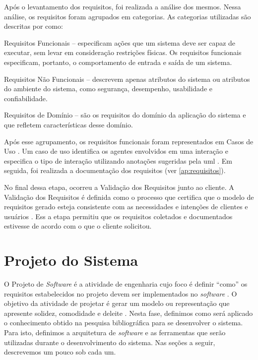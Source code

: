 Após o levantamento dos requisitos, foi realizada a análise dos mesmos. Nessa análise, os requisitos foram agrupados em categorias. As categorias utilizadas são descritas por 
 como:
\begin{alineascomponto}
    \item Requisitos Funcionais -- especificam ações que um sistema deve ser
capaz de executar, sem levar em consideração restrições físicas. Os requisitos
funcionais especificam, portanto, o comportamento de entrada e saída de um
sistema.
    \item Requisitos Não Funcionais -- descrevem apenas atributos do sistema ou
atributos do ambiente do sistema, como segurança, desempenho, usabilidade e
confiabilidade.
    \item Requisitos de Domínio -- são os requisitos do domínio da aplicação do sistema e que refletem características desse domínio.
\end{alineascomponto}

Após esse agrupamento, os requisitos funcionais foram representados em Casos de Uso \cite{jacobson92engenharia}. Um caso de uso identifica os agentes envolvidos em uma interação e especifica o tipo  de interação utilizando anotações sugeridas pela 
\gls{uml} . Em seguida, foi realizada a documentação dos requisitos (ver \autoref{ap:requisitos}).

No final dessa etapa, ocorreu a Validação dos Requisitos junto ao cliente.  A Validação dos Requisitos é definida como o processo que certifica que o modelo de requisitos gerado  esteja  consistente  
com  as  necessidades  e  intenções  de  clientes  e usuários \cite{rilston2003metodologia}. Ess	a etapa permitiu que os requisitos coletados e documentados estivesse de acordo com o que o 
cliente solicitou.

\section{Projeto do Sistema}

O Projeto de \textit{Software} é a atividade de engenharia cujo foco é definir ``como'' os requisitos estabelecidos no projeto devem ser implementados no \textit{software} \cite{pressman2006engenharia}. O objetivo da  
atividade de projetar é gerar um modelo ou representação que apresente solidez, comodidade e deleite \cite{pressman2006engenharia}. Nesta fase, definimos como será aplicado o conhecimento obtido na 
pesquisa bibliográfica para se desenvolver o sistema. Para isto, definimos a arquitetura de \textit{software} e as ferramentas que serão utilizadas durante o desenvolvimento do sistema. Nas seções a seguir, 
descrevemos um pouco sob cada um.

